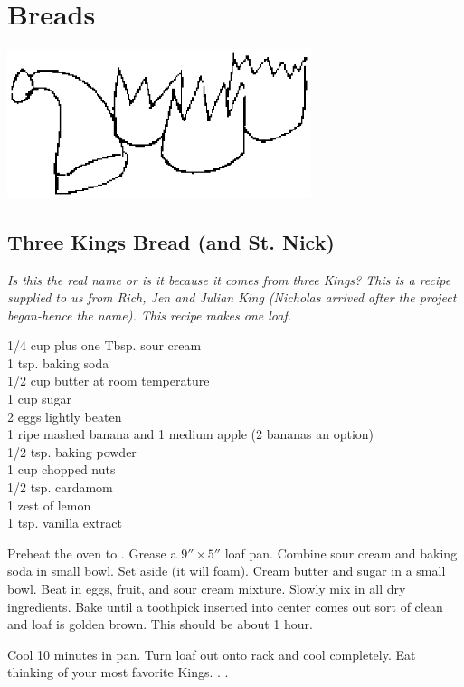 \chapter{Breads}

\centerline{\includegraphics[width=3.5in,clip]{kings.ps}}
\section{Three Kings Bread (and St. Nick)}

\textit{Is this the real name or is it because it comes from three Kings?  This
is a recipe supplied to us from Rich, Jen and Julian King (Nicholas arrived
after the project began-hence the name).  This recipe makes one loaf.}
\begin{ingredients}
1/4 cup plus one Tbsp. sour cream \\
1 tsp. baking soda \\
1/2 cup butter at room temperature \\
1 cup sugar \\
2 eggs lightly beaten \\
1 ripe mashed banana and 1 medium apple (2 bananas an option) \\
1/2 tsp. baking powder \\
1 cup chopped nuts \\
1/2 tsp. cardamom \\
1 zest of lemon \\
1 tsp. vanilla extract
\end{ingredients}
Preheat the oven to .  Grease a $9''\times 5''$ loaf pan.  
Combine sour
cream and baking soda in small bowl.  Set aside (it will foam).  Cream butter
and sugar in a small bowl.  Beat in eggs, fruit, and sour cream mixture. 
Slowly mix in all dry ingredients.  Bake until a toothpick inserted into center
comes out sort of clean and loaf is golden brown.  This should be about 1 hour.
 
Cool 10 minutes in pan. Turn loaf out onto rack and cool completely.  Eat
thinking of your most favorite Kings. . .

